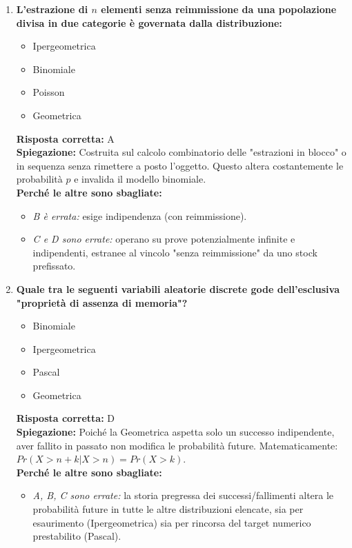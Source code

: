 \documentclass[12pt, a4paper]{article}
\begin{document}
\begin{enumerate}[label=\textbf{\arabic*.}]
    \item \textbf{L'estrazione di $n$ elementi senza reimmissione da una popolazione divisa in due categorie è governata dalla distribuzione:}
    \begin{itemize}
        \item[A)] Ipergeometrica
        \item[B)] Binomiale
        \item[C)] Poisson
        \item[D)] Geometrica
    \end{itemize}
    \textbf{Risposta corretta:} A \\
    \textbf{Spiegazione:} Costruita sul calcolo combinatorio delle "estrazioni in blocco" o in sequenza senza rimettere a posto l'oggetto. Questo altera costantemente le probabilità $p$ e invalida il modello binomiale. \\
    \textbf{Perché le altre sono sbagliate:}
    \begin{itemize}
        \item \textit{B è errata:} esige indipendenza (con reimmissione).
        \item \textit{C e D sono errate:} operano su prove potenzialmente infinite e indipendenti, estranee al vincolo "senza reimmissione" da uno stock prefissato.
    \end{itemize}

    \item \textbf{Quale tra le seguenti variabili aleatorie discrete gode dell'esclusiva "proprietà di assenza di memoria"?}
    \begin{itemize}
        \item[A)] Binomiale
        \item[B)] Ipergeometrica
        \item[C)] Pascal
        \item[D)] Geometrica
    \end{itemize}
    \textbf{Risposta corretta:} D \\
    \textbf{Spiegazione:} Poiché la Geometrica aspetta solo un successo indipendente, aver fallito in passato non modifica le probabilità future. Matematicamente: $Pr(X>n+k | X>n) = Pr(X>k)$. \\
    \textbf{Perché le altre sono sbagliate:}
    \begin{itemize}
        \item \textit{A, B, C sono errate:} la storia pregressa dei successi/fallimenti altera le probabilità future in tutte le altre distribuzioni elencate, sia per esaurimento (Ipergeometrica) sia per rincorsa del target numerico prestabilito (Pascal).
    \end{itemize}


\end{enumerate}
\end{document}
